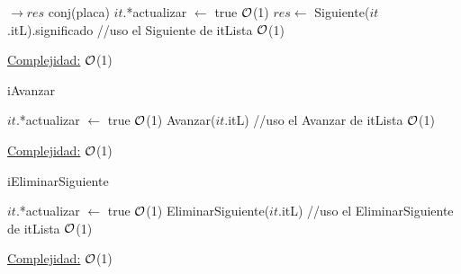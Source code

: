 \begin{Algoritmos}
\begin{algorithm}[H]
		\begin{algorithmic}[1]
			 $\to res$ conj(placa)
			\State $it$.*actualizar $\gets$ true \Comment $\mathcal{O}$(1)
			\State $res \leftarrow$ Siguiente($it$.itL).significado //uso el Siguiente de itLista \Comment $\mathcal{O}$(1)
			\EndProcedure 
		\end{algorithmic}
		\underline{Complejidad:} $\mathcal{O}$(1)
	\end{algorithm}
	
	\begin{algorithm}[H]
		\caption{iAvanzar}
		
		\begin{algorithmic}[1]
			\State $it$.*actualizar $\gets$ true \Comment $\mathcal{O}$(1)
			\State Avanzar($it$.itL) //uso el Avanzar de itLista \Comment $\mathcal{O}$(1)
			\EndProcedure 
		\end{algorithmic}
		\underline{Complejidad:} $\mathcal{O}$(1)
	\end{algorithm}
	
	\begin{algorithm}[H]
		\caption{iEliminarSiguiente}
		
		\begin{algorithmic}[1]
			\State $it$.*actualizar $\gets$ true \Comment $\mathcal{O}$(1)			
			\State EliminarSiguiente($it$.itL) //uso el EliminarSiguiente de itLista \Comment $\mathcal{O}$(1)
			\EndProcedure 
		\end{algorithmic}
		\underline{Complejidad:} $\mathcal{O}$(1)
	\end{algorithm}	
	
\end{Algoritmos}